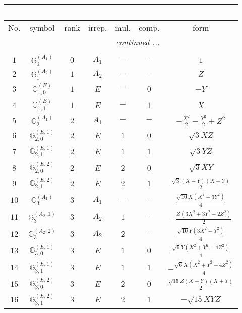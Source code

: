 \documentclass[fleqn,10pt,landscape]{article}
\begin{document}
\begin{itemize}
\begin{center}
\begin{longtable}{ccccccc}
\multicolumn{6}{l}{\tablename\ \thetable{}} \\
 \hline \hline
No. & symbol & rank & irrep. & mul. & comp. & form \\ \hline \endhead

 \hline \hline
\multicolumn{6}{r}{\footnotesize\it continued ...} \\ \endfoot

 \hline \hline
\multicolumn{6}{r}{} \\ \endlastfoot

$ 1 $ & $ \mathbb{G}_{0}^{(A_{1})} $ & $ 0 $ & $ A_{1} $ & $ - $ & $ - $ & $ 1 $ \\ \hline
$ 2 $ & $ \mathbb{G}_{1}^{(A_{2})} $ & $ 1 $ & $ A_{2} $ & $ - $ & $ - $ & $ Z $ \\
$ 3 $ & $ \mathbb{G}_{1,0}^{(E)} $ & $ 1 $ & $ E $ & $ - $ & $ 0 $ & $ - Y $ \\
$ 4 $ & $ \mathbb{G}_{1,1}^{(E)} $ & $ 1 $ & $ E $ & $ - $ & $ 1 $ & $ X $ \\ \hline
$ 5 $ & $ \mathbb{G}_{2}^{(A_{1})} $ & $ 2 $ & $ A_{1} $ & $ - $ & $ - $ & $ - \frac{X^{2}}{2} - \frac{Y^{2}}{2} + Z^{2} $ \\
$ 6 $ & $ \mathbb{G}_{2,0}^{(E,1)} $ & $ 2 $ & $ E $ & $ 1 $ & $ 0 $ & $ \sqrt{3} X Z $ \\
$ 7 $ & $ \mathbb{G}_{2,1}^{(E,1)} $ & $ 2 $ & $ E $ & $ 1 $ & $ 1 $ & $ \sqrt{3} Y Z $ \\
$ 8 $ & $ \mathbb{G}_{2,0}^{(E,2)} $ & $ 2 $ & $ E $ & $ 2 $ & $ 0 $ & $ \sqrt{3} X Y $ \\
$ 9 $ & $ \mathbb{G}_{2,1}^{(E,2)} $ & $ 2 $ & $ E $ & $ 2 $ & $ 1 $ & $ \frac{\sqrt{3} \left(X - Y\right) \left(X + Y\right)}{2} $ \\ \hline
$ 10 $ & $ \mathbb{G}_{3}^{(A_{1})} $ & $ 3 $ & $ A_{1} $ & $ - $ & $ - $ & $ \frac{\sqrt{10} X \left(X^{2} - 3 Y^{2}\right)}{4} $ \\
$ 11 $ & $ \mathbb{G}_{3}^{(A_{2},1)} $ & $ 3 $ & $ A_{2} $ & $ 1 $ & $ - $ & $ - \frac{Z \left(3 X^{2} + 3 Y^{2} - 2 Z^{2}\right)}{2} $ \\
$ 12 $ & $ \mathbb{G}_{3}^{(A_{2},2)} $ & $ 3 $ & $ A_{2} $ & $ 2 $ & $ - $ & $ \frac{\sqrt{10} Y \left(3 X^{2} - Y^{2}\right)}{4} $ \\
$ 13 $ & $ \mathbb{G}_{3,0}^{(E,1)} $ & $ 3 $ & $ E $ & $ 1 $ & $ 0 $ & $ \frac{\sqrt{6} Y \left(X^{2} + Y^{2} - 4 Z^{2}\right)}{4} $ \\
$ 14 $ & $ \mathbb{G}_{3,1}^{(E,1)} $ & $ 3 $ & $ E $ & $ 1 $ & $ 1 $ & $ - \frac{\sqrt{6} X \left(X^{2} + Y^{2} - 4 Z^{2}\right)}{4} $ \\
$ 15 $ & $ \mathbb{G}_{3,0}^{(E,2)} $ & $ 3 $ & $ E $ & $ 2 $ & $ 0 $ & $ \frac{\sqrt{15} Z \left(X - Y\right) \left(X + Y\right)}{2} $ \\
$ 16 $ & $ \mathbb{G}_{3,1}^{(E,2)} $ & $ 3 $ & $ E $ & $ 2 $ & $ 1 $ & $ - \sqrt{15} X Y Z $ \\
\end{longtable}
\end{center}


\end{itemize}
\end{document}
